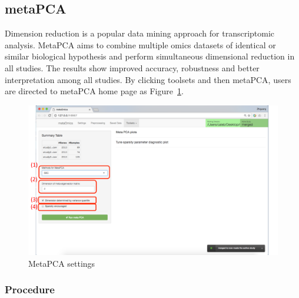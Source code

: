 \subsection{metaPCA}
Dimension reduction is a popular data mining approach for transcriptomic analysis.
MetaPCA aims to combine multiple omics datasets of identical or similar biological hypothesis and perform simultaneous dimensional reduction in all studies.
The results show improved accuracy, robustness and better interpretation among all studies.
By clicking toolsets and then metaPCA,
users are directed to metaPCA home page as Figure~\ref{fig:metaPCAHome}.

\begin{figure}[H]
\begin{center}
\includegraphics[scale=0.5]{./figure/metaPCA/metaPCAHome}
\caption{MetaPCA settings}
\label{fig:metaPCAHome}
\end{center}
\end{figure}

\subsubsection{Procedure}

